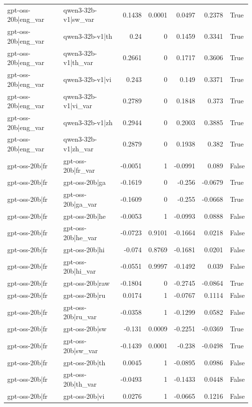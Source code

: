 \begin{table}
\begin{tabular}{l l r r r r l}
gpt-oss-20b|eng_var & qwen3-32b-v1|sw_var & 0.1438 & 0.0001 & 0.0497 & 0.2378 & True \\
gpt-oss-20b|eng_var & qwen3-32b-v1|th & 0.24 & 0 & 0.1459 & 0.3341 & True \\
gpt-oss-20b|eng_var & qwen3-32b-v1|th_var & 0.2661 & 0 & 0.1717 & 0.3606 & True \\
gpt-oss-20b|eng_var & qwen3-32b-v1|vi & 0.243 & 0 & 0.149 & 0.3371 & True \\
gpt-oss-20b|eng_var & qwen3-32b-v1|vi_var & 0.2789 & 0 & 0.1848 & 0.373 & True \\
gpt-oss-20b|eng_var & qwen3-32b-v1|zh & 0.2944 & 0 & 0.2003 & 0.3885 & True \\
gpt-oss-20b|eng_var & qwen3-32b-v1|zh_var & 0.2879 & 0 & 0.1938 & 0.382 & True \\
gpt-oss-20b|fr & gpt-oss-20b|fr_var & -0.0051 & 1 & -0.0991 & 0.089 & False \\
gpt-oss-20b|fr & gpt-oss-20b|ga & -0.1619 & 0 & -0.256 & -0.0679 & True \\
gpt-oss-20b|fr & gpt-oss-20b|ga_var & -0.1609 & 0 & -0.255 & -0.0668 & True \\
gpt-oss-20b|fr & gpt-oss-20b|he & -0.0053 & 1 & -0.0993 & 0.0888 & False \\
gpt-oss-20b|fr & gpt-oss-20b|he_var & -0.0723 & 0.9101 & -0.1664 & 0.0218 & False \\
gpt-oss-20b|fr & gpt-oss-20b|hi & -0.074 & 0.8769 & -0.1681 & 0.0201 & False \\
gpt-oss-20b|fr & gpt-oss-20b|hi_var & -0.0551 & 0.9997 & -0.1492 & 0.039 & False \\
gpt-oss-20b|fr & gpt-oss-20b|raw & -0.1804 & 0 & -0.2745 & -0.0864 & True \\
gpt-oss-20b|fr & gpt-oss-20b|ru & 0.0174 & 1 & -0.0767 & 0.1114 & False \\
gpt-oss-20b|fr & gpt-oss-20b|ru_var & -0.0358 & 1 & -0.1299 & 0.0582 & False \\
gpt-oss-20b|fr & gpt-oss-20b|sw & -0.131 & 0.0009 & -0.2251 & -0.0369 & True \\
gpt-oss-20b|fr & gpt-oss-20b|sw_var & -0.1439 & 0.0001 & -0.238 & -0.0498 & True \\
gpt-oss-20b|fr & gpt-oss-20b|th & 0.0045 & 1 & -0.0895 & 0.0986 & False \\
gpt-oss-20b|fr & gpt-oss-20b|th_var & -0.0493 & 1 & -0.1433 & 0.0448 & False \\
gpt-oss-20b|fr & gpt-oss-20b|vi & 0.0276 & 1 & -0.0665 & 0.1216 & False \\

\end{tabular}
\end{table}
